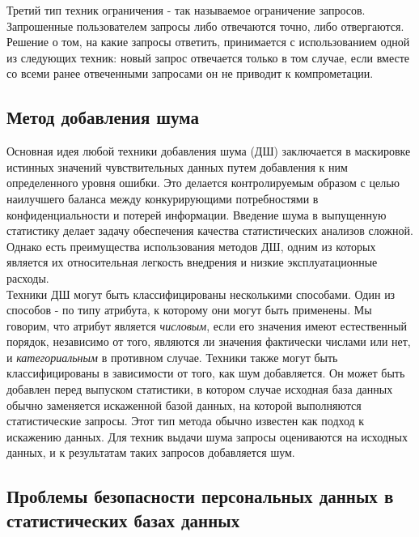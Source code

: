 Третий тип техник ограничения - так называемое ограничение запросов. Запрошенные пользователем запросы либо отвечаются точно, либо отвергаются. Решение о том, на какие запросы ответить, принимается с использованием одной из следующих техник: новый запрос отвечается только в том случае, если вместе со всеми ранее отвеченными запросами он не приводит к компрометации. 
\\

\subsection{Метод добавления шума}

Основная идея любой техники добавления шума (ДШ) заключается в маскировке истинных значений чувствительных данных путем добавления к ним определенного уровня ошибки. Это делается контролируемым образом с целью наилучшего баланса между конкурирующими потребностями в конфиденциальности и потерей информации. Введение шума в выпущенную статистику делает задачу обеспечения качества статистических анализов сложной. Однако есть преимущества использования методов ДШ, одним из которых является их относительная легкость внедрения и низкие эксплуатационные расходы.
\\

Техники ДШ могут быть классифицированы несколькими способами. Один из способов - по типу атрибута, к которому они могут быть применены. Мы говорим, что атрибут является \textit{числовым}, если его значения имеют естественный порядок, независимо от того, являются ли значения фактически числами или нет, и \textit{категориальным} в противном случае. Техники также могут быть классифицированы в зависимости от того, как шум добавляется. Он может быть добавлен перед выпуском статистики, в котором случае исходная база данных обычно заменяется искаженной базой данных, на которой выполняются статистические запросы. Этот тип метода обычно известен как подход к искажению данных. Для техник выдачи шума запросы оцениваются на исходных данных, и к результатам таких запросов добавляется шум.
\\

\subsection{Проблемы безопасности персональных данных в статистических базах данных}

